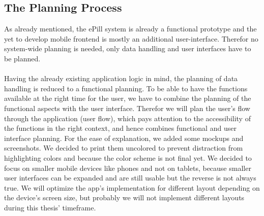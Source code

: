 \subsection{The Planning Process}
\label{subsec:Planning}
As already mentioned, the ePill system is already a functional prototype and the yet to develop mobile frontend is mostly an additional user-interface. Therefor no system-wide planning is needed, only data handling and user interfaces have to be planned.
\\
\\
Having the already existing application logic in mind, the planning of data handling is reduced to a functional planning. To be able to have the functions available at the right time for the user, we have to combine the planning of the functional aspects with the user interface. Therefor we will plan the user's flow through the application (user flow), which pays attention to the accessibility of the functions in the right context, and hence combines functional and user interface planning. For the ease of explanation, we added some mockups and screenshots. We decided to print them uncolored to prevent distraction from highlighting colors and because the color scheme is not final yet. We decided to focus on smaller mobile devices like phones and not on tablets, because smaller user interfaces can be expanded and are still usable but the reverse is not always true. We will optimize the app's implementation for different layout depending on the device's screen size, but probably we will not implement different layouts during this thesis' timeframe.
\\
